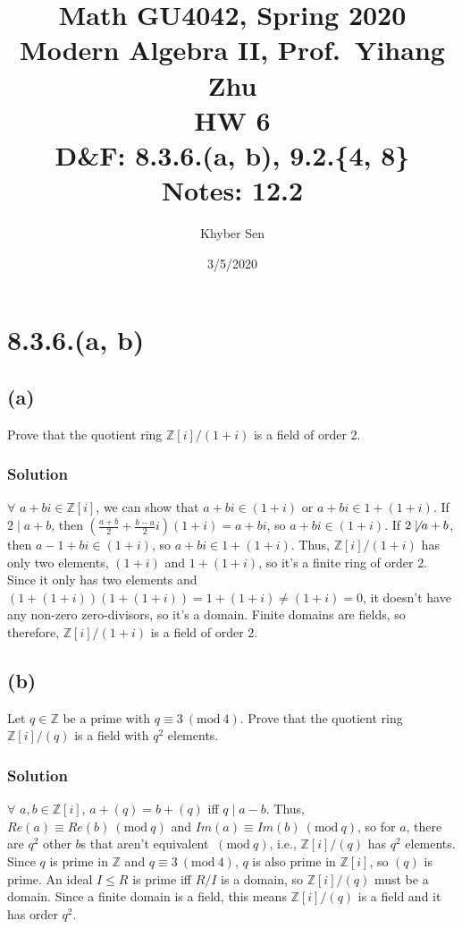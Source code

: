 \documentclass[fleqn]{article}
\title{
Math GU4042, Spring 2020 \\
Modern Algebra II, Prof.\ Yihang Zhu \\
HW 6 \\
D\&F: 8.3.6.(a, b), 9.2.\{4, 8\} \\
Notes: 12.2 \\
}
\author{Khyber Sen}
\date{3/5/2020}
\newcommand{\Mod}[1]{\ (\mathrm{mod}\ #1)}
\begin{document}
    
    \maketitle
    
    \section{8.3.6.(a, b)}
        
        \subsection{(a)}
        Prove that the quotient ring $\mathbb{Z}[i]/(1 + i)$ is a field of order 2.
            
            \subsubsection{Solution}
            $\forall$ $a + bi \in \mathbb{Z}[i]$, we can show that $a + bi \in (1 + i)$ or $a + bi \in 1 + (1 + i)$.  If $2 \mid a + b$, then $\left(\frac{a + b}{2} + \frac{b - a}{2}i\right)(1 + i) = a + bi$, so $a + bi \in (1 + i)$.  If $2 \not\mid a + b$, then $a - 1 + bi \in (1 + i)$, so $a + bi \in 1 + (1 + i)$.  Thus, $\mathbb{Z}[i]/(1 + i)$ has only two elements, $(1 + i)$ and $1 + (1 + i)$, so it's a finite ring of order 2.  Since it only has two elements and $(1 + (1 + i))(1 + (1 + i)) = 1 + (1 + i) \neq (1 + i) = 0$, it doesn't have any non-zero zero-divisors, so it's a domain.  Finite domains are fields, so therefore, $\mathbb{Z}[i]/(1 + i)$ is a field of order 2.
        
        \subsection{(b)}
        Let $q \in \mathbb{Z}$ be a prime with $q \equiv 3 \Mod{4}$.  Prove that the quotient ring $\mathbb{Z}[i]/(q)$ is a field with $q^2$ elements.
        
            \subsubsection{Solution}
            $\forall$ $a, b \in \mathbb{Z}[i]$, $a + (q) = b + (q)$ iff $q \mid a - b$.  Thus, $Re(a) \equiv Re(b) \Mod{q}$ and $Im(a) \equiv Im(b) \Mod{q}$, so for $a$, there are $q^2$ other $b$s that aren't equivalent $\Mod{q}$, i.e., $\mathbb{Z}[i]/(q)$ has $q^2$ elements.  Since $q$ is prime in $\mathbb{Z}$ and $q \equiv 3 \Mod{4}$, $q$ is also prime in $\mathbb{Z}[i]$, so $(q)$ is prime.  An ideal $I \leq R$ is prime iff $R/I$ is a domain, so $\mathbb{Z}[i]/(q)$ must be a domain.  Since a finite domain is a field, this means $\mathbb{Z}[i]/(q)$ is a field and it has order $q^2$.
            
\end{document}
